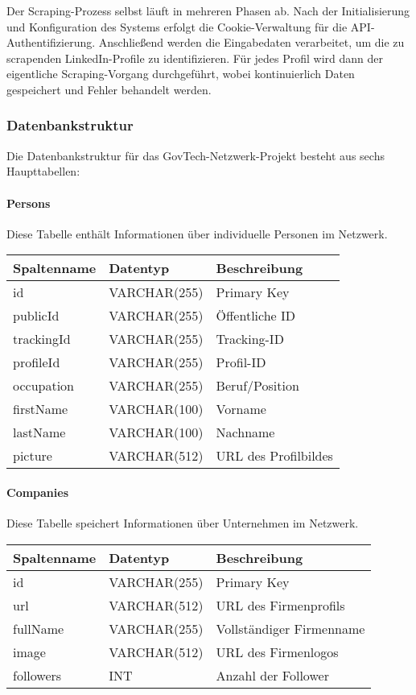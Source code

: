 \documentclass[a4paper,11pt]{article}
\begin{document}
Der Scraping-Prozess selbst läuft in mehreren Phasen ab. Nach der Initialisierung und Konfiguration des Systems erfolgt die Cookie-Verwaltung für die API-Authentifizierung. Anschließend werden die Eingabedaten verarbeitet, um die zu scrapenden LinkedIn-Profile zu identifizieren. Für jedes Profil wird dann der eigentliche Scraping-Vorgang durchgeführt, wobei kontinuierlich Daten gespeichert und Fehler behandelt werden.



\subsubsection{Datenbankstruktur}

Die Datenbankstruktur für das GovTech-Netzwerk-Projekt besteht aus sechs Haupttabellen:

\paragraph{Persons}
Diese Tabelle enthält Informationen über individuelle Personen im Netzwerk.

\begin{table}[h]
\begin{tabular}{|l|l|l|}
\hline
\textbf{Spaltenname} & \textbf{Datentyp} & \textbf{Beschreibung} \\
\hline
id & VARCHAR(255) & Primary Key \\
publicId & VARCHAR(255) & Öffentliche ID \\
trackingId & VARCHAR(255) & Tracking-ID \\
profileId & VARCHAR(255) & Profil-ID \\
occupation & VARCHAR(255) & Beruf/Position \\
firstName & VARCHAR(100) & Vorname \\
lastName & VARCHAR(100) & Nachname \\
picture & VARCHAR(512) & URL des Profilbildes \\
\hline
\end{tabular}
\end{table}

\paragraph{Companies}
Diese Tabelle speichert Informationen über Unternehmen im Netzwerk.

\begin{table}[h]
\begin{tabular}{|l|l|l|}
\hline
\textbf{Spaltenname} & \textbf{Datentyp} & \textbf{Beschreibung} \\
\hline
id & VARCHAR(255) & Primary Key \\
url & VARCHAR(512) & URL des Firmenprofils \\
fullName & VARCHAR(255) & Vollständiger Firmenname \\
image & VARCHAR(512) & URL des Firmenlogos \\
followers & INT & Anzahl der Follower \\
\hline
\end{tabular}
\end{table}
\end{document}
